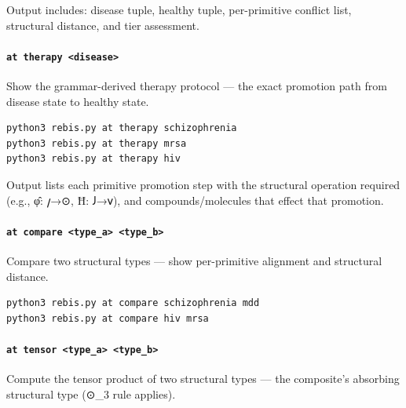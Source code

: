 \documentclass[12pt,a4paper]{article}
\begin{document}
Output includes: disease tuple, healthy tuple, per-primitive conflict
list, structural distance, and tier assessment.

\hypertarget{at-therapy-disease}{%
\paragraph{\texorpdfstring{\texttt{at\ therapy\ \textless{}disease\textgreater{}}}{at therapy \textless disease\textgreater{}}}\label{at-therapy-disease}}

Show the grammar-derived therapy protocol --- the exact promotion path
from disease state to healthy state.

\begin{verbatim}
python3 rebis.py at therapy schizophrenia
python3 rebis.py at therapy mrsa
python3 rebis.py at therapy hiv
\end{verbatim}

Output lists each primitive promotion step with the structural operation
required (e.g., φ̂: 𐑢→⊙, Ħ: 𐑓→𐑫), and compounds/molecules that effect
that promotion.

\hypertarget{at-compare-type_a-type_b}{%
\paragraph{\texorpdfstring{\texttt{at\ compare\ \textless{}type\_a\textgreater{}\ \textless{}type\_b\textgreater{}}}{at compare \textless type\_a\textgreater{} \textless type\_b\textgreater{}}}\label{at-compare-type_a-type_b}}

Compare two structural types --- show per-primitive alignment and
structural distance.

\begin{verbatim}
python3 rebis.py at compare schizophrenia mdd
python3 rebis.py at compare hiv mrsa
\end{verbatim}

\hypertarget{at-tensor-type_a-type_b}{%
\paragraph{\texorpdfstring{\texttt{at\ tensor\ \textless{}type\_a\textgreater{}\ \textless{}type\_b\textgreater{}}}{at tensor \textless type\_a\textgreater{} \textless type\_b\textgreater{}}}\label{at-tensor-type_a-type_b}}

Compute the tensor product of two structural types --- the composite's
absorbing structural type (⊙\_3 rule applies).
\end{document}
